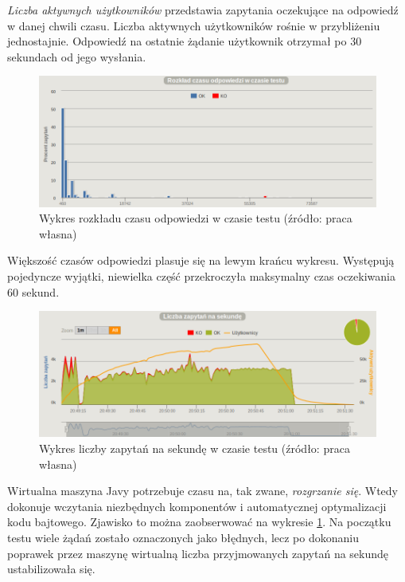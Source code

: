 \documentclass[12pt,twoside]{article}
\begin{document}
\emph{Liczba aktywnych użytkowników} przedstawia zapytania oczekujące na
odpowiedź w danej chwili czasu. Liczba aktywnych użytkowników rośnie w
przybliżeniu jednostajnie. Odpowiedź na ostatnie żądanie użytkownik
otrzymał po 30 sekundach od jego wysłania.

\begin{figure}[htbp]
\centering
\includegraphics[resolution=150]{test_results/java/simpletest/screenshots/distribution.png}
\caption{Wykres rozkładu czasu odpowiedzi w czasie testu (źródło: praca własna)}
\end{figure}

Większość czasów odpowiedzi plasuje się na lewym krańcu wykresu.
Występują pojedyncze wyjątki, niewielka część przekroczyła maksymalny
czas oczekiwania 60 sekund.

\begin{figure}[htbp]
\centering
\includegraphics[resolution=150]{test_results/java/simpletest/screenshots/requests.png}
\caption{Wykres liczby zapytań na sekundę w czasie testu (źródło: praca własna)}
\label{java:simple:requests}
\end{figure}

Wirtualna maszyna Javy potrzebuje czasu na, tak zwane, \emph{rozgrzanie
się}. Wtedy dokonuje wczytania niezbędnych komponentów i automatycznej
optymalizacji kodu bajtowego. Zjawisko to można zaobserwować na wykresie
\ref{java:simple:requests}. Na początku testu wiele żądań zostało
oznaczonych jako błędnych, lecz po dokonaniu poprawek przez maszynę
wirtualną liczba przyjmowanych zapytań na sekundę ustabilizowała się.
\end{document}
